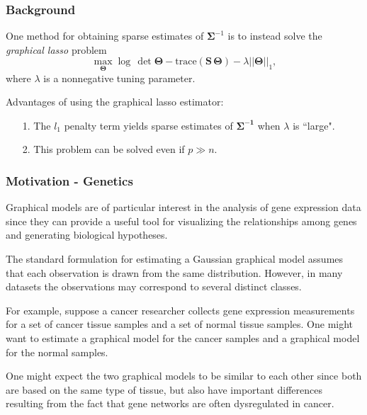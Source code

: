 \documentclass[t]{beamer}
\begin{document}
\begin{frame}
\frametitle{Background}
One method for obtaining sparse estimates of $\bm{\Sigma}^{-1}$ is to instead solve the \textit{graphical lasso} problem
\small
\begin{equation*}
\max_{\bm{\Theta}} \log\,\det \bm{\Theta} - \mbox{trace}\left(\bm{S \,\Theta}\right) - \lambda ||\bm{\Theta}||_{1},
\end{equation*}
\normalsize
where $\lambda$ is a nonnegative tuning parameter. 



\bigskip
\pause
Advantages of using the graphical lasso estimator:
\begin{itemize}
\item[1.]  The $l_{1}$ penalty term yields sparse estimates of $\bm{\Sigma^{-1}}$ when $\lambda$ is ``large".

\bigskip
\item[2.] This problem can be solved even if $p \gg n$.
\end{itemize}
\end{frame}

\begin{frame}
\frametitle{Motivation - Genetics}
Graphical models are of particular interest in the analysis of gene expression data since they can provide a useful tool for visualizing the relationships among genes and generating biological hypotheses.

\bigskip
\pause
The standard formulation for estimating a Gaussian graphical model assumes that each observation is drawn from the same distribution. However, in many datasets the observations may correspond to several distinct classes.

\bigskip
\pause
For example, suppose a cancer researcher collects gene expression measurements for a set of cancer tissue samples and a set of normal tissue samples.  One might want to estimate a graphical model for the cancer samples and a graphical model for the normal samples.

\bigskip
\pause
One might expect the two graphical models to be similar to each other since both are based on the same type of tissue, but also have important differences resulting from the fact that gene networks are often dysregulated in cancer.

\end{frame}
\end{document}
